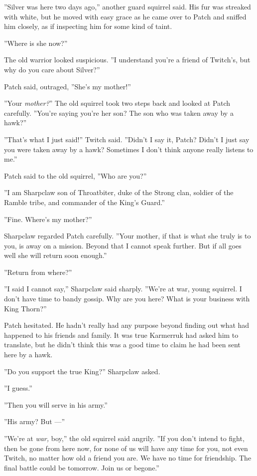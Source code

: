 \documentclass[12pt]{book}
\begin{document}
''Silver was here two days ago,'' another guard squirrel said. His fur
was streaked with white, but he moved with easy grace as he came over
to Patch and sniffed him closely, as if inspecting him for some kind
of taint.

''Where is she now?''

The old warrior looked suspicious. ''I understand you're a friend of
Twitch's, but why do you care about Silver?''

Patch said, outraged, ''She's my mother!''

''Your \textit{mother?}'' The old squirrel took two steps back and
looked at Patch carefully. ''You're saying you're her son? The son who
was taken away by a hawk?''

''That's what I just said!'' Twitch said. ''Didn't I say it, Patch?
Didn't I just say you were taken away by a hawk? Sometimes I don't
think anyone really listens to me.''

Patch said to the old squirrel, ''Who are you?''

''I am Sharpclaw son of Throatbiter, duke of the Strong clan, soldier
of the Ramble tribe, and commander of the King's Guard.''

''Fine. Where's my mother?''

Sharpclaw regarded Patch carefully. ''Your mother, if that is what she
truly is to you, is away on a mission. Beyond that I cannot speak
further. But if all goes well she will return soon enough.''

''Return from where?''

''I said I cannot say,'' Sharpclaw said sharply. ''We're at war, young
squirrel. I don't have time to bandy gossip. Why are you here? What is
your business with King Thorn?''

Patch hesitated. He hadn't really had any purpose beyond finding out
what had happened to his friends and family. It was true Karmerruk had
asked him to translate, but he didn't think this was a good time to
claim he had been sent here by a hawk.

''Do you support the true King?'' Sharpclaw asked.

''I guess.''

''Then you will serve in his army.''

''His army? But ---''

''We're at \textit{war,} boy,'' the old squirrel said angrily. ''If
you don't intend to fight, then be gone from here now, for none of us
will have any time for you, not even Twitch, no matter how old a
friend you are. We have no time for friendship. The final battle could
be tomorrow. Join us or begone.''
\end{document}
